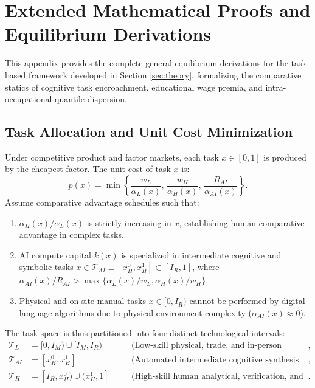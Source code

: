 \documentclass[12pt]{article}
\begin{document}
\section{Extended Mathematical Proofs and Equilibrium Derivations}
\label{app:proofs}

This appendix provides the complete general equilibrium derivations for the task-based framework developed in Section \ref{sec:theory}, formalizing the comparative statics of cognitive task encroachment, educational wage premia, and intra-occupational quantile dispersion.

\subsection{Task Allocation and Unit Cost Minimization}

Under competitive product and factor markets, each task $x \in [0, 1]$ is produced by the cheapest factor. The unit cost of task $x$ is:
\begin{equation}
p(x) = \min \left\{ \frac{w_L}{\alpha_L(x)}, \, \frac{w_H}{\alpha_H(x)}, \, \frac{R_{AI}}{\alpha_{AI}(x)} \right\}.
\end{equation}
Assume comparative advantage schedules such that:
\begin{enumerate}
    \item $\alpha_H(x) / \alpha_L(x)$ is strictly increasing in $x$, establishing human comparative advantage in complex tasks.
    \item AI compute capital $k(x)$ is specialized in intermediate cognitive and symbolic tasks $x \in \mathcal{T}_{AI} \equiv [x_H^0, x_H^1] \subset [I_R, 1]$, where $\alpha_{AI}(x) / R_{AI} > \max\{ \alpha_L(x)/w_L, \alpha_H(x)/w_H \}$.
    \item Physical and on-site manual tasks $x \in [0, I_R)$ cannot be performed by digital language algorithms due to physical environment complexity ($\alpha_{AI}(x) \approx 0$).
\end{enumerate}

The task space is thus partitioned into four distinct technological intervals:
\begin{align}
\mathcal{T}_L &= [0, I_M) \cup [I_M, I_R) \quad &&\text{(Low-skill physical, trade, and in-person service tasks)}, \\
\mathcal{T}_{AI} &= [x_H^0, x_H^1] \quad &&\text{(Automated intermediate cognitive synthesis band)}, \\
\mathcal{T}_H &= [I_R, x_H^0) \cup (x_H^1, 1] \quad &&\text{(High-skill human analytical, verification, and judgment tasks)}.
\end{align}
\end{document}
